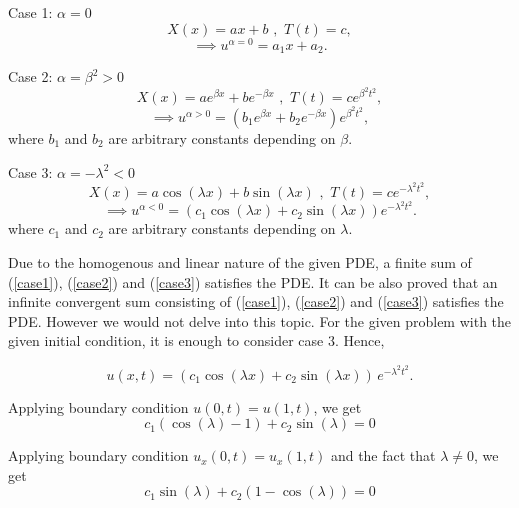 \documentclass[12pt]{article}
\begin{document}
	Case 1: $\alpha=0$
	\begin{equation*}
	        X(x)=ax+b\,\,,\,\, T(t)=c,
	\end{equation*}
	\begin{equation} \label{case1}
	\implies u^{\alpha=0}=a_1 x + a_2.
	\end{equation}
	
	Case 2: $\alpha = \beta^2 > 0$
	\begin{equation*}
	X(x)=ae^{\beta x}+be^{-\beta x}\,\,,\,\, T(t)=ce^{\beta^2 t^2},
	\end{equation*}
	\begin{equation}\label{case2}
	\implies u^{\alpha>0}=(b_1e^{\beta x}+b_2e^{-\beta x})e^{\beta^2 t^2},
	\end{equation}
	where $b_1$ and $b_2$ are arbitrary constants depending on $\beta$.
	
	Case 3: $\alpha = -\lambda^2 < 0$
	\begin{equation*}
	X(x)=a\cos({\lambda x})+b\sin({\lambda x})\,\,,\,\, T(t)=ce^{-\lambda^2 t^2},
	\end{equation*}
	\begin{equation}\label{case3}
	\implies u^{\alpha<0}=(c_1\cos({\lambda x})+c_2\sin({\lambda x}))e^{-\lambda^2 t^2}.
	\end{equation}
	where $c_1$ and $c_2$ are arbitrary constants depending on $\lambda$.
		
	Due to the homogenous and linear nature of the given PDE, a finite sum of (\ref{case1}), (\ref{case2}) and (\ref{case3}) satisfies the PDE. It can be also proved that an infinite convergent sum consisting of (\ref{case1}), (\ref{case2}) and (\ref{case3}) satisfies the PDE. However we would not delve into this topic. For the given problem with the given initial condition, it is enough to consider case 3. Hence, 
	
	\begin{equation}
	u(x,t) = \left(c_1\cos({\lambda x})+c_2\sin({\lambda x})\right)\,e^{-\lambda^2 t^2}.
	\end{equation}	
		
	Applying boundary condition $u(0,t) = u(1,t)$, we get		
	\begin{equation} \label{eq1}
	c_1(\cos({\lambda })-1)+c_2\sin({\lambda}) = 0
	\end{equation} 
	
	Applying boundary condition $u_x(0,t)=u_x(1,t)$ and the fact that $\lambda \neq 0$, we get	
	\begin{equation} \label{eq2}
	c_1\sin(\lambda) + c_2(1-\cos(\lambda))=0 \end{equation}
	
\end{document}
